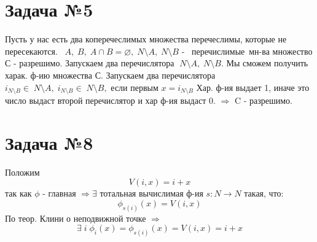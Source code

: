 \documentclass[a4paper,12pt]{article} %
\begin{document}

\section*{Задача №5}
 Пусть у нас есть два коперечеслимых множества перечеслимы,
 которые не пересекаются.
 $A, \; B,\; A \cap B = \varnothing, \; N \setminus A, \; N\setminus B$ -  перечислимые мн-ва
множество С - разрешимо. Запускаем два перечислятора  $\; N \setminus A, \; N\setminus B$.
Мы сможем получить харак. ф-ию множества С. Запускаем два перечислятора  
$i_{N \setminus B} \in \; N \setminus A, \; i_{N \setminus B} \in \;
 N\setminus B,$ если  первым $x = i_{N \setminus B}$ Хар. ф-ия выдает 1, 
 иначе это число выдаст второй перечислятор и хар ф-ия выдаст 0. $\Rightarrow$ C - разрешимо.
 

\section*{Задача №8}
Положим \[V(i, x) = i + x\]
так как $\phi$ - главная $\Rightarrow \exists \text{ тотальная вычислимая ф-ия }s:N \rightarrow N $ такая, что:
\[\phi_{s(i)}(x) = V(i, x)\]
По  теор. Клини о неподвижной точке $\Rightarrow$
\[\exists \; i \; \phi_i(x) = \phi_{s(i)}(x) = V(i,x) = i + x \]
\end{document}
